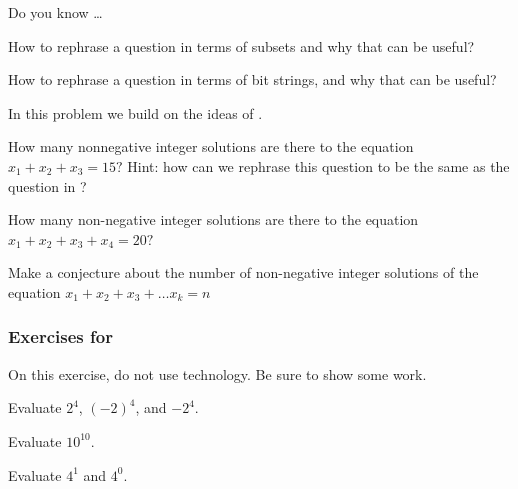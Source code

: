 \begin{exer}[\exerR] %
\label{exer_dyk_rephrase_question}
    Do you know \ldots
        \begin{exerpart}
            \item How to rephrase a question in terms of subsets and why that can be useful? 
            \item How to rephrase a question in terms of bit strings, and why that can be useful? 
        \end{exerpart}
\end{exer}

\begin{exer} [\exerE] %
\label{exer_integer_simplex}
    In this problem we build on the ideas of .
    \begin{exerpart}
         \item How many nonnegative integer solutions are there to the equation $x_1+x_2+x_3=15?$  
         Hint: how can we rephrase this question to be the same as the question in ?
         \item How many non-negative integer solutions are there to the equation $x_1+x_2+x_3+x_4=20?$
         \item Make a conjecture about the number of non-negative integer solutions of the equation 
         $x_1+x_2+x_3+\ldots x_k=n$    
    \end{exerpart}
\end{exer}


\subsubsection*{Exercises for  \subexplog}

\begin{exer} [\exerP] %
\label{exer_evaluate_powers}
     On this exercise, do not use technology.  Be sure to show some work.
     \begin{exerpart}
         \item Evaluate $2^4$, $(-2)^4$, and $-2^4$.
         \item Evaluate $10^{10}$.
         \item Evaluate $4^1$ and $4^0$.
     \end{exerpart}
\end{exer}


